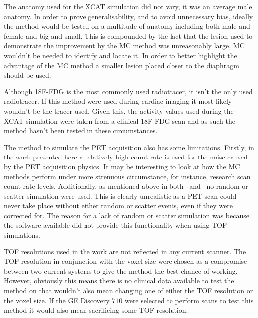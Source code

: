         The anatomy used for the \gls{XCAT} simulation did not vary, it was an average male anatomy. In order to prove generalisability, and to avoid unnecessary bias, ideally the method would be tested on a multitude of anatomy including both male and female and big and small. This is compounded by the fact that the lesion used to demonstrate the improvement by the \gls{MC} method was unreasonably large, \gls{MC} wouldn't be needed to identify and locate it. In order to better highlight the advantage of the \gls{MC} method a smaller lesion placed closer to the diaphragm should be used.
        
        Although \gls{18F-FDG} is the most commonly used radiotracer, it isn't the only used radiotracer. If this method were used during cardiac imaging it most likely wouldn't be the tracer used. Given this, the activity values used during the \gls{XCAT} simulation were taken from a clinical \gls{18F-FDG} scan and as such the method hasn't been tested in these circumstances.
        
        The method to simulate the \gls{PET} acquisition also has some limitations. Firstly, in the work presented here a relatively high count rate is used for the noise caused by the \gls{PET} acquisition physics. It may be interesting to look at how the \gls{MC} methods perform under more strenuous circumstance, for instance, research scan count rate levels. Additionally, as mentioned above in both~ and~ no random or scatter simulation were used. This is clearly unrealistic as a \gls{PET} scan could never take place without either random or scatter events, even if they were corrected for. The reason for a lack of random or scatter simulation was because the software available did not provide this functionality when using \gls{TOF} simulations.
        
        \gls{TOF} resolutions used in the work are not reflected in any current scanner. The \gls{TOF} resolution in conjunction with the voxel size were chosen as a compromise between two current systems to give the method the best chance of working. However, obviously this means there is no clinical data available to test the method on that wouldn't also mean changing one of either the \gls{TOF} resolution or the voxel size. If the \gls{GE} Discovery $710$ were selected to perform scans to test this method it would also mean sacrificing some \gls{TOF} resolution.
        
